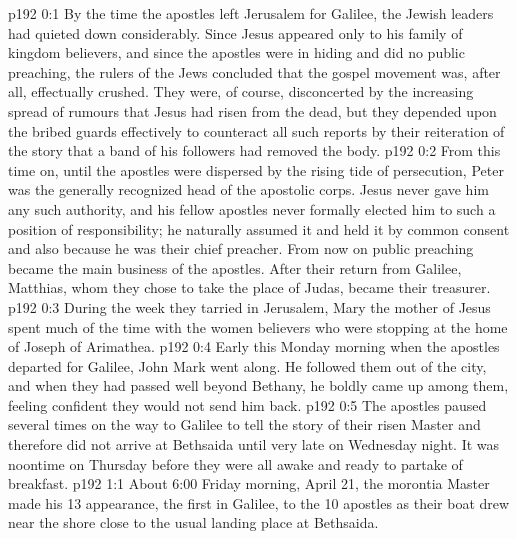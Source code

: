 \author{Midwayer Commission}
\vs p192 0:1 By the time the apostles left Jerusalem for Galilee, the Jewish leaders had quieted down considerably. Since Jesus appeared only to his family of kingdom believers, and since the apostles were in hiding and did no public preaching, the rulers of the Jews concluded that the gospel movement was, after all, effectually crushed. They were, of course, disconcerted by the increasing spread of rumours that Jesus had risen from the dead, but they depended upon the bribed guards effectively to counteract all such reports by their reiteration of the story that a band of his followers had removed the body.
\vs p192 0:2 From this time on, until the apostles were dispersed by the rising tide of persecution, Peter was the generally recognized head of the apostolic corps. Jesus never gave him any such authority, and his fellow apostles never formally elected him to such a position of responsibility; he naturally assumed it and held it by common consent and also because he was their chief preacher. From now on public preaching became the main business of the apostles. After their return from Galilee, Matthias, whom they chose to take the place of Judas, became their treasurer.
\vs p192 0:3 During the week they tarried in Jerusalem, Mary the mother of Jesus spent much of the time with the women believers who were stopping at the home of Joseph of Arimathea.
\vs p192 0:4 Early this Monday morning when the apostles departed for Galilee, John Mark went along. He followed them out of the city, and when they had passed well beyond Bethany, he boldly came up among them, feeling confident they would not send him back.
\vs p192 0:5 The apostles paused several times on the way to Galilee to tell the story of their risen Master and therefore did not arrive at Bethsaida until very late on Wednesday night. It was noontime on Thursday before they were all awake and ready to partake of breakfast.
\vs p192 1:1 About 6:00 Friday morning, April 21, the morontia Master made his 13 appearance, the first in Galilee, to the 10 apostles as their boat drew near the shore close to the usual landing place at Bethsaida.
